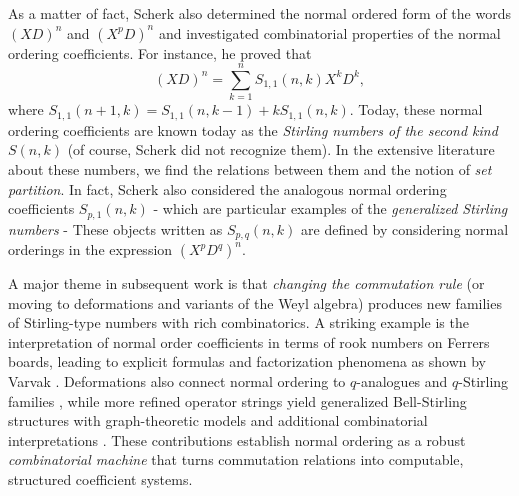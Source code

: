 \documentclass{amsart}
\theoremstyle{definition}
\theoremstyle{remark}
\numberwithin{equation}{section}
\begin{document}
As a matter of fact, Scherk \cite{Scherk1823} also determined the normal ordered form of the words $(XD)^n$ and $(X^pD)^n$ and investigated combinatorial properties of the normal ordering coefficients. For instance, he proved that 
\begin{equation}
(XD)^n = \sum_{k=1}^n S_{1,1}(n, k) X^kD^k,
\end{equation}
where $S_{1,1}(n+1, k) = S_{1,1}(n, k-1) + kS_{1,1}(n, k)$. Today, these normal ordering coefficients are known today as the {\em Stirling numbers of the second kind} $S(n, k)$ \cite[A008277]{Sloane} (of course, Scherk did not recognize them). In the extensive literature about these numbers, we find the relations between them and the notion of {\em set partition}. In fact, Scherk also considered the analogous normal ordering coefficients $S_{p, 1}(n, k)$ - which are particular examples of the {\em generalized Stirling numbers} - These objects written as $S_{p, q}(n, k)$ are defined by considering normal orderings in the expression $(X^{p} D^{q})^n$. 

A major theme in subsequent work is that \emph{changing the commutation rule} (or moving to deformations and variants of the Weyl algebra) produces new families of Stirling-type numbers with rich combinatorics. A striking example is the interpretation of normal order coefficients in terms of rook numbers on Ferrers boards, leading to explicit formulas and factorization phenomena as shown by Varvak \cite{Varvak2005}. Deformations also connect normal ordering to $q$-analogues and $q$-Stirling families \cite{Schork2006}, while more refined operator strings yield generalized Bell-Stirling structures with graph-theoretic models and additional combinatorial interpretations \cite{MendezBlasiakPenson2005,CodaraDAntonaHell2014}. These contributions establish normal ordering as a robust \emph{combinatorial machine} that turns commutation relations into computable, structured coefficient systems.
\end{document}
